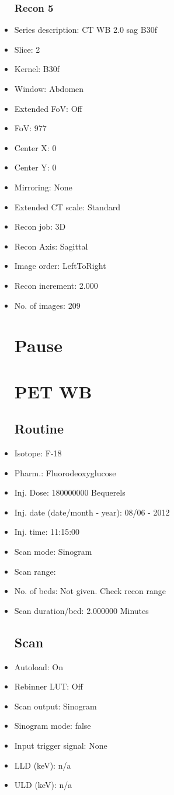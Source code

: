 \documentclass[12pt]{article}
\begin{document}
\begin{itemize}
\subsubsection{Recon 5}
\item Series description: CT WB 2.0 sag B30f
\item Slice: 2
\item Kernel: B30f
\item Window: Abdomen
\item Extended FoV: Off
\item FoV: 977
\item Center X: 0
\item Center Y: 0
\item Mirroring: None
\item Extended CT scale: Standard
\item Recon job: 3D
\item Recon Axis: Sagittal
\item Image order: LeftToRight
\item Recon increment: 2.000
\item No. of images: 209
\section{Pause}
\section{PET WB}\subsection{Routine}
\item Isotope: F-18
\item Pharm.: Fluorodeoxyglucose
\item Inj. Dose: 180000000 Bequerels
\item Inj. date (date/month - year): 08/06 - 2012
\item Inj. time: 11:15:00
\item Scan mode: Sinogram
\item Scan range: 
\item No. of beds: Not given. Check recon range
\item Scan duration/bed: 2.000000 Minutes
\subsection{Scan}
\item Autoload: On
\item Rebinner LUT: Off
\item Scan output: Sinogram
\item Sinogram mode: false
\item Input trigger signal: None
\item LLD (keV): n/a
\item ULD (keV): n/a

\end{itemize}
\end{document}
